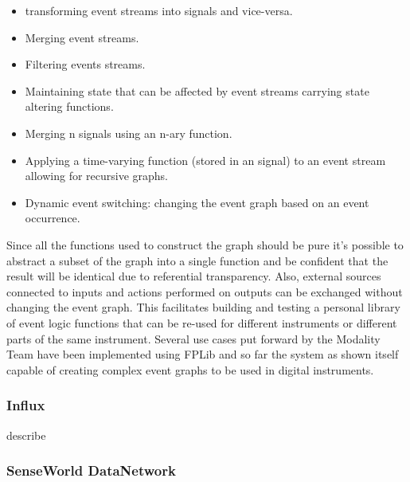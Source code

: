 \documentclass{article}
\begin{document}
\begin{itemize}

\item transforming event streams into signals and vice-versa.
\item Merging event streams.
\item Filtering events streams.
\item Maintaining state that can be affected by event streams carrying state altering functions.
\item Merging n signals using an n-ary function.
\item Applying a time-varying function (stored in an signal) to an event stream allowing for recursive graphs.
\item Dynamic event switching: changing the event graph based on an event occurrence.
\end{itemize}

Since all the functions used to construct the graph should be pure it's possible to abstract a subset of the graph into a single function and be confident that the result will be identical due to referential transparency. Also, external sources connected to inputs and actions performed on outputs can be exchanged without changing the event graph. This facilitates building and testing a personal library of event logic functions that can be re-used for different instruments or different parts of the same instrument. Several use cases put forward by the Modality Team have been implemented using FPLib and so far the system as shown itself capable of creating complex event graphs to be used in digital instruments.

\subsubsection{Influx}
\label{sub:influx}

describe


\subsubsection{SenseWorld DataNetwork}
\end{document}
